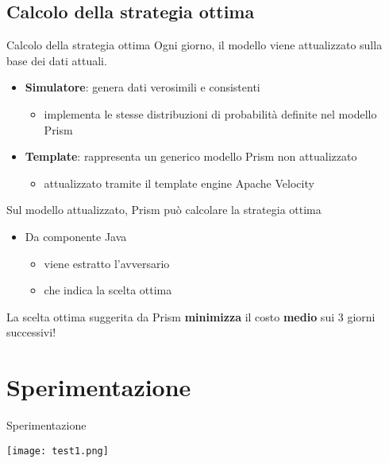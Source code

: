 \documentclass[9pt]{beamer}
\begin{document}
        \subsection{Calcolo della strategia ottima}
            \begin{frame}{Calcolo della strategia ottima}
              Ogni giorno, il modello viene attualizzato sulla base dei dati attuali.
              \begin{itemize}
                \item \textbf{Simulatore}: genera dati verosimili e consistenti
                \begin{itemize}
                  \item implementa le stesse distribuzioni di probabilità definite nel modello Prism
                \end{itemize}
                \item \textbf{Template}: rappresenta un generico modello Prism non attualizzato
                \begin{itemize}
                  \item attualizzato tramite il template engine Apache Velocity
                \end{itemize}
              \end{itemize}
              \vspace{1cm}
              Sul modello attualizzato, Prism può calcolare la strategia ottima
              \begin{itemize}
                \item Da componente Java
                \begin{itemize}
                  \item viene estratto l'avversario
                  \item che indica la scelta ottima
                \end{itemize}
              \end{itemize}
              \vspace{1cm}
              La scelta ottima suggerita da Prism \textbf{minimizza} il costo \textbf{medio} sui 3 giorni successivi! 
            \end{frame}
            
    \section{Sperimentazione}
    
        \begin{frame}{Sperimentazione}
          \begin{center}
            \texttt{[image: test1.png]}
          \end{center}
        \end{frame}
\end{document}

